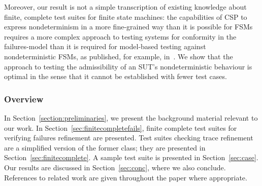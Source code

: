 Moreover, our result is not a simple transcription of existing knowledge
about finite, complete test suites for finite state machines: the
capabilities of CSP to express nondeterminism in a more fine-grained way than
it is possible for FSMs requires a more complex approach to testing systems
for conformity in the failures-model than it is required for model-based
testing against nondeterministic FSMs, as published, for example,
in~\cite{hierons_testing_2004,DBLP:conf/hase/PetrenkoY14}. We show that the
approach to testing the admissibility of an SUT's nondeterministic behaviour
is optimal in the sense that it cannot be established with fewer test cases.



\subsubsection*{Overview}
In Section~\ref{section:preliminaries}, we present the background material
relevant to our work. In Section~\ref{sec:finitecompletefails}, finite
complete test suites for verifying failures refinement are presented. Test
suites checking trace refinement are a simplified version of the former
class; they are presented in Section~\ref{sec:finitecomplete}. A sample test
suite is presented in Section~\ref{sec:case}. Our results are discussed in
Section~\ref{sec:conc}, where we also conclude. References to related work
are given throughout the paper where appropriate.

